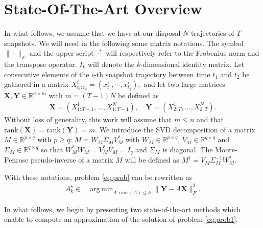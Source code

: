 \documentclass{article}
\newcommand{\Rr}{\mathds{R}}
\newcommand{\XI}{{X}}
\newcommand{\AAA}{\mathbf{X}}
\newcommand{\BBB}{\mathbf{Y}}
\DeclareMathOperator*{\argmin}{arg\,min}
\def\remCH#1{{\noindent\color{red}{{\footnotesize [CH: #1]}}}}
\begin{document}
 

\section{State-Of-The-Art Overview}\label{sec:stateArt}

In what follows,  we assume that we have at our disposal  $N$ trajectories of $T$ snapshots.    We will  need in the following some matrix notations. The symbol $\|\cdot\|_F$ and the upper script $\cdot^*$ will respectively refer to the Frobenius norm and the transpose operator. $I_k$ will denote the $k$-dimensional identity matrix. %
 Let consecutive elements of the $i$-th snapshot trajectory between time $t_1$ and $t_2$  be  gathered in a matrix   $\XI_{t_1:t_2}^i = (x^i_{t_1},\cdots,x^i_{t_2}),$ and let  two large matrices  $ \AAA, \BBB \in \Rr^{n \times  m} $ with $m=(T-1)N$ be defined as 
  \begin{align}\label{eq:matrixAB}
 \AAA = (\XI^1_{1:T-1}, ..., \XI^N_{1:T-1}), \quad 
 \BBB= ( \XI^1_{2:T}, ...,  \XI^N_{2:T}) .
 \end{align}
 Without loss of generality, this work will assume that $m\leq n$ and that $\textrm{rank}(\AAA)=\textrm{rank}(\BBB)=m$.  
 We introduce the SVD decomposition of a matrix $M\in \Rr^{p \times q }$ with $p\ge q$: $M=W_M\Sigma_M V_M^*$ with $W_M\in \Rr^{p \times q }$, $V_M\in \Rr^{ q \times  q}$ and $\Sigma_M\in \Rr^{q  \times q }$ so that $W_M^*W_M=V_M^*V_M=I_q$ and $\Sigma_M$ is diagonal. The  Moore-Penrose pseudo-inverse of a matrix  $M$  will be defined as 
 $M^\dagger=V_M\Sigma_M^{-1} W_M^*$.
 
With these notations, problem \eqref{eq:prob} can be rewritten as %
		\begin{align}\label{eq:prob1} 
		A_k^\star \in &\argmin_{A:\textrm{rank}(A)\le k} \|\BBB -A \AAA \|_F^2.
		\end{align} 

In what follows, we begin by presenting two state-of-the-art methods which enable to compute an approximation of the solution of problem  \eqref{eq:prob1}.
 
\end{document}

